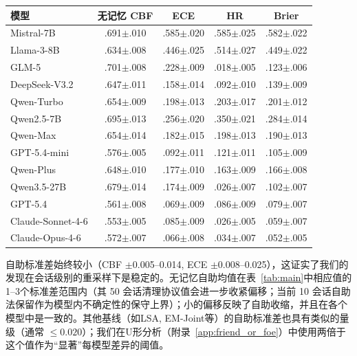 \documentclass[11pt,a4paper,fontset=fandol]{ctexart}
\begin{document}
\begin{center}
\small
\begin{tabular}{l cccc}
\toprule
\textbf{模型} & \textbf{无记忆 CBF} & \textbf{ECE} & \textbf{HR} & \textbf{Brier} \\
\midrule
Mistral-7B          & .691$\pm$.010 & .585$\pm$.020 & .585$\pm$.025 & .582$\pm$.022 \\
Llama-3-8B          & .634$\pm$.008 & .446$\pm$.025 & .514$\pm$.027 & .449$\pm$.022 \\
GLM-5               & .701$\pm$.008 & .228$\pm$.009 & .018$\pm$.005 & .123$\pm$.006 \\
DeepSeek-V3.2       & .647$\pm$.011 & .158$\pm$.014 & .092$\pm$.010 & .139$\pm$.009 \\
Qwen-Turbo          & .654$\pm$.009 & .198$\pm$.013 & .203$\pm$.017 & .201$\pm$.012 \\
Qwen2.5-7B          & .695$\pm$.013 & .256$\pm$.020 & .350$\pm$.021 & .284$\pm$.014 \\
Qwen-Max            & .654$\pm$.014 & .182$\pm$.015 & .198$\pm$.013 & .190$\pm$.013 \\
GPT-5.4-mini        & .576$\pm$.005 & .092$\pm$.011 & .121$\pm$.011 & .105$\pm$.009 \\
Qwen-Plus           & .648$\pm$.010 & .177$\pm$.010 & .163$\pm$.009 & .166$\pm$.008 \\
Qwen3.5-27B         & .679$\pm$.014 & .174$\pm$.009 & .026$\pm$.007 & .102$\pm$.007 \\
GPT-5.4             & .561$\pm$.008 & .069$\pm$.009 & .086$\pm$.009 & .079$\pm$.007 \\
Claude-Sonnet-4-6   & .553$\pm$.005 & .085$\pm$.009 & .026$\pm$.005 & .059$\pm$.007 \\
Claude-Opus-4-6     & .572$\pm$.007 & .066$\pm$.008 & .034$\pm$.007 & .052$\pm$.005 \\
\bottomrule
\end{tabular}
\end{center}

自助标准差始终较小（CBF $\pm$0.005--0.014, ECE $\pm$0.008--0.025），这证实了我们的发现在会话级别的重采样下是稳定的。无记忆自助均值在表~\ref{tab:main}中相应值的1--3个标准差范围内（其 50 会话清理协议值会进一步收紧偏移；当前 10 会话自助法保留作为模型内不确定性的保守上界）；小的偏移反映了自助收缩，并且在各个模型中是一致的。其他基线（如LSA, EM-Joint等）的自助标准差也具有类似的量级（通常 $\leq 0.020$）；我们在U形分析（附录~\ref{app:friend_or_foe}）中使用两倍于这个值作为“显著”每模型差异的阈值。
\end{document}
